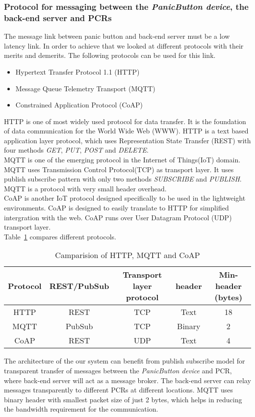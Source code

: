\subsubsection{Protocol for messaging between the \emph{PanicButton device}, the back-end server and PCRs}
The message link between panic button and back-end server must be a low latency link. In order to achieve that we looked at different protocols with their merits and demerits. The following protocols can be used for this link.
\begin{itemize}
\item Hypertext Transfer Protocol 1.1 (HTTP)
\item Message Queue Telemetry Transport (MQTT)
\item Constrained Application Protocol (CoAP)
\end{itemize} 
HTTP is one of most widely used protocol for data transfer. It is the foundation of data communication for the World Wide Web (WWW). HTTP is a text based application layer protocol, which uses Representation State Transfer (REST) with four methods \emph{GET}, \emph{PUT}, \emph{POST} and \emph{DELETE}.\\
MQTT is one of the emerging protocol in the Internet of Things(IoT) domain. MQTT uses Transmission Control Protocol(TCP) as transport layer. It uses publish subscribe pattern with only two methods \emph{SUBSCRIBE} and \emph{PUBLISH}. MQTT is a protocol with very small header overhead.\\
CoAP is another IoT protocol designed specifically to be used in the lightweight environments.  CoAP is designed to easily translate to HTTP for simplified intergration with the web. CoAP runs over User Datagram Protocol (UDP) transport layer.\\
Table~\ref{tab:mess_procotols} compares different protocols.
\begin{table}[H]
\begin{center}
\begin{tabular}{ |c|c|c|c|c| } 
 \hline
 \textbf{Protocol} & \textbf{REST/PubSub} & \textbf{Transport layer protocol} &\textbf{header} & \textbf{Min-header (bytes)} \\
 \hline 
 \hline
 HTTP & REST & TCP & Text & 18 \\
 \hline
 MQTT & PubSub & TCP & Binary & 2 \\ 
 \hline
 CoAP & REST & UDP & Text & 4  \\ 
 \hline
\end{tabular}
\end{center}
\caption{Camparision of HTTP, MQTT and CoAP} \label{tab:mess_procotols}
\end{table}
The architecture of the our system can benefit from publish subscribe model for transparent transfer of messages between the \emph{PanicButton device} and PCR, where back-end server will act as a message broker. The back-end server can relay messages transparently to different PCRs at different locations. MQTT uses binary header with smallest packet size of just 2 bytes, which helps in reducing the bandwidth requirement for the communication. 
